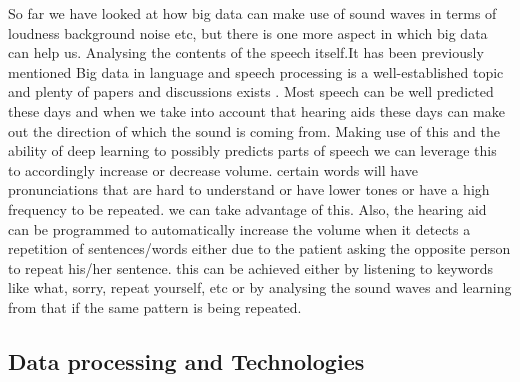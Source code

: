 \documentclass[sigconf]{acmart}
\begin{document}
So far we have looked at how big data can make use of sound waves in terms of loudness background noise etc, but there is one more aspect in which big data can help us. Analysing the contents of the speech itself.It has been previously mentioned Big data in language and speech processing is a well-established topic and plenty of papers and discussions exists \cite{Chung2017} \cite{Schuller2015}. Most speech can be well predicted these days and when we take into account that hearing aids these days can make out the direction of which the sound is coming from. Making use of this and the ability of deep learning to possibly predicts parts of speech we can leverage this to accordingly increase or decrease volume. certain words will have pronunciations that are hard to understand or have lower tones or have a high frequency to be repeated. we can take advantage of this. Also, the hearing aid can be programmed to automatically increase the volume when it detects a repetition of sentences/words either due to the patient asking the opposite person to repeat his/her sentence. this can be achieved either by listening to keywords like what, sorry, repeat yourself, etc or by analysing the sound waves and learning from that if the same pattern is being repeated. 

\subsection{Data processing and Technologies}
\end{document}
